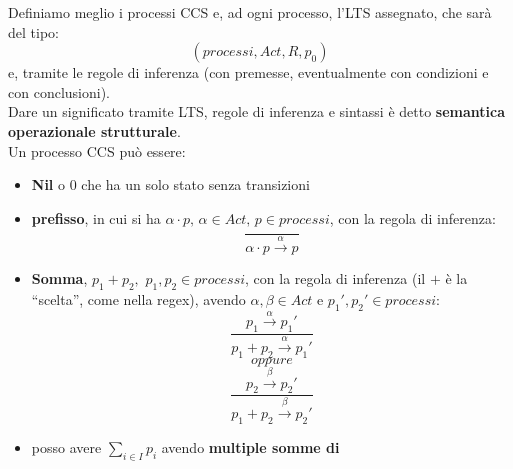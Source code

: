 \documentclass[a4paper,12pt, oneside]{book}
\begin{document}
Definiamo meglio i processi CCS e, ad ogni processo, l'LTS assegnato, che sarà
del tipo:
\[(processi, Act, R, p_0)\]
e, tramite le regole di inferenza (con premesse, eventualmente con condizioni
e con conclusioni).\\
Dare un significato tramite LTS, regole di inferenza e sintassi è detto
\textbf{semantica operazionale strutturale}.\\
Un processo CCS può essere:
\begin{itemize}
  \item \textbf{Nil} o $0$ che ha un solo stato senza transizioni
  \begin{center}
  \end{center}
  \item \textbf{prefisso}, in cui si ha $\alpha\cdot p,\,\alpha\in Act,\,p\in
  processi$, con la regola di inferenza:
  \[\frac{}{\alpha\cdot p\stackrel{\alpha}{\rightarrow}p}\]
  \begin{center}
  \end{center}
  \item \textbf{Somma}, $p_1+p_2,\,\,p_1,p_2\in processi$, con la regola di
  inferenza (il $+$ è la ``scelta'', come nella regex), avendo $\alpha,\beta\in
  Act$ e $p_1',p_2'\in processi$:
  \[\frac{p_1\stackrel{\alpha}{\rightarrow}p_1'}{p_1+p_2
      \stackrel{\alpha}{\rightarrow}p_1'}\] 
  \[oppure\]
   \[\frac{p_2\stackrel{\beta}{\rightarrow}p_2'}{p_1+p_2
       \stackrel{\beta}{\rightarrow}p_2'}\]
   \begin{center}
  \end{center}
  \item posso avere $\sum_{i\in I}p_i$ avendo \textbf{multiple somme di
}
\end{itemize}
\end{document}
